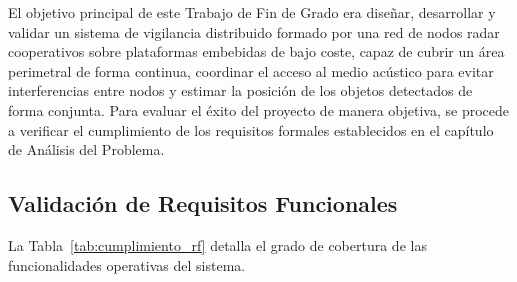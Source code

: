 El objetivo principal de este Trabajo de Fin de Grado era diseñar, desarrollar y validar un sistema de vigilancia distribuido formado por una red de nodos radar cooperativos sobre plataformas embebidas de bajo coste, capaz de cubrir un área perimetral de forma continua, coordinar el acceso al medio acústico para evitar interferencias entre nodos y estimar la posición de los objetos detectados de forma conjunta. Para evaluar el éxito del proyecto de manera objetiva, se procede a verificar el cumplimiento de los requisitos formales establecidos en el capítulo de Análisis del Problema.

\subsection{Validación de Requisitos Funcionales}

La Tabla~\ref{tab:cumplimiento_rf} detalla el grado de cobertura de las funcionalidades operativas del sistema.

